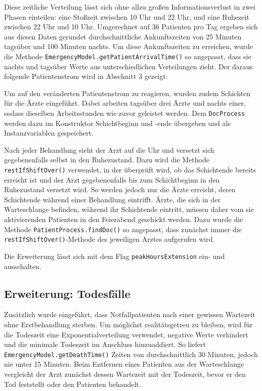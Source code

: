 \documentclass{article}
\begin{document}
Diese zeitliche Verteilung lässt sich ohne allzu großen Informationsverlust in zwei Phasen einteilen: eine Stoßzeit zwischen 10 Uhr und 22 Uhr, und eine Ruhezeit zwischen 22 Uhr und 10 Uhr.
Umgerechnet auf 36 Patienten pro Tag ergeben sich aus diesen Daten gerundet durchschnittliche Ankunftszeiten von 25 Minuten tagsüber und 100 Minuten nachts.
Um diese Ankunftszeiten zu erreichen, wurde die Methode \texttt{EmergencyModel.getPatientArrivalTime()} so angepasst, dass sie nachts und tagsüber Werte aus unterschiedlichen Verteilungen zieht.
Der daraus folgende Patientenstrom wird in Abschnitt 3 gezeigt.

Um auf den veränderten Patientenstrom zu reagieren, wurden zudem Schichten für die Ärzte eingeführt.
Dabei arbeiten tagsüber drei Ärzte und nachts einer, sodass dieselben Arbeitsstunden wie zuvor geleistet werden.
Dem \texttt{DocProcess} werden dazu im Konstruktor Schichtbeginn und -ende übergeben und als Instanzvariablen gespeichert.

Nach jeder Behandlung sieht der Arzt auf die Uhr und versetzt sich gegebenenfalls selbst in den Ruhezustand.
Dazu wird die Methode \texttt{restIfShiftOver()} verwendet, in der überprüft wird, ob das Schichtende bereits erreicht ist und der Arzt gegebenenfalls bis zum Schichtbeginn in den Ruhezustand versetzt wird.
So werden jedoch nur die Ärzte erreicht, deren Schichtende während einer Behandlung eintrifft.
Ärzte, die sich in der Warteschlange befinden, während ihr Schichtende eintritt, müssen daher vom sie aktivierenden Patienten \glqq in den Feierabend geschickt\grqq{} werden.
Dazu wurde die Methode \texttt{PatientProcess.findDoc()} so angepasst, dass zunächst immer die \texttt{restIfShiftOver()}-Methode des jeweiligen Arztes aufgerufen wird.

Die Erweiterung lässt sich mit dem Flag \texttt{peakHoursExtension} ein- und ausschalten.

\subsection{Erweiterung: Todesfälle}

Zusätzlich wurde eingeführt, dass Notfallpatienten nach einer gewissen Wartezeit ohne Erstbehandlung sterben.
Um möglichst realitätsgetreu zu bleiben, wird für die \glqq Todeszeit\grqq{} eine Exponentialverteilung verwendet, negative Werte verhindert und die minimale Todeszeit im Anschluss hinzuaddiert.
So liefert \texttt{EmergencyModel.getDeathTime()} Zeiten von durchschnittlich 30 Minuten, jedoch nie unter 15 Minuten.
Beim Entfernen eines Patienten aus der Warteschlange vergleicht der Arzt zunächst dessen Wartezeit mit der \glqq Todeszeit\grqq{}, bevor er den Tod feststellt oder den Patienten behandelt.
\end{document}
